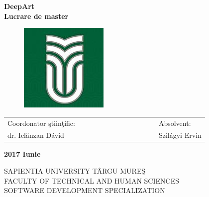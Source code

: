 \documentclass[12pt, a4paper, oneside]{book}
\theoremstyle{tetel}
\begin{document}
\begin{center}
    \vspace{3cm}\LARGE \textbf{DeepArt}\\
    \vspace{1cm}\LARGE\textbf{Lucrare de master}\\
\end{center}

\vspace{2cm}
\begin{figure}[htb]
\hspace{5.7cm}\includegraphics[bb = 0 0 160 160]{sapi.jpg}
\end{figure}

\vspace{2cm}
\begin{center}
\begin{tabular}{lcccccccccccl}
    Coordonator \c{s}tiin\c{t}ific:&&&&&&& &&&&&Absolvent:\\
     dr. Iclănzan Dávid&&&&&& &&&&&&Szilágyi Ervin\\

\end{tabular}
\end{center}

\begin{center}
    \vspace{1cm}\textbf{2017 Iunie}
\end{center}


\newpage
\thispagestyle{empty}
\begin{center}
    \Large SAPIENTIA UNIVERSITY TÂRGU MURE\c{S}\\
    \Large FACULTY OF TECHNICAL AND HUMAN SCIENCES\\
    \Large SOFTWARE DEVELOPMENT SPECIALIZATION\\
\end{center}
\end{document}
